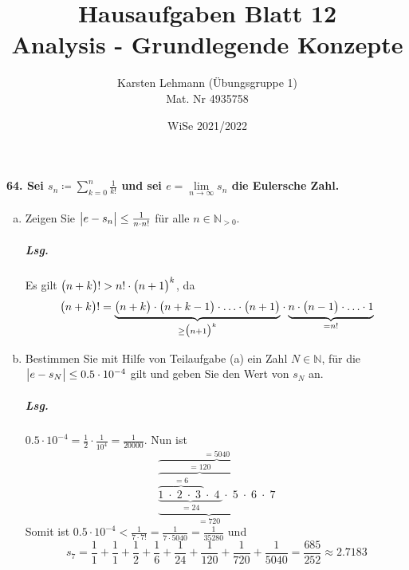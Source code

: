 \documentclass{scrreprt}
\author{Karsten Lehmann (Übungsgruppe 1)\\Mat. Nr 4935758}
\date{WiSe 2021/2022}
\title{Hausaufgaben Blatt 12\\Analysis - Grundlegende Konzepte}
\begin{document}
\paragraph{64. Sei $s_n \coloneqq \sum_{k = 0}^n \frac{1}{k!}$ und sei
  $e = \underset{n \to \infty}\lim s_n$ die Eulersche Zahl.}
\begin{enumerate}[(a)]
\item Zeigen Sie $\abs\big{e - s_n} \leq \frac{1}{n \cdot n!}$ für alle
  $n \in \mathbb{N}_{> 0}$.

  \subparagraph{Lsg.} Es gilt $\qty\big(n + k)! > n! \cdot \qty\big(n + 1)^k$, da
  \[
    \qty\big(n + k)! =
    \underset{\geq \qty\big(n + 1)^k}{
      \underbrace{
        \qty\big(n + k) \cdot \qty\big(n + k - 1) \cdot
        \ldots \cdot \qty\big(n + 1)
      }
    } \cdot
    \underset{= n!}{\underbrace{n \cdot \qty\big(n - 1) \cdot \ldots \cdot 1}}
  \]

\item Bestimmen Sie mit Hilfe von Teilaufgabe (a) ein Zahl $N \in \mathbb{N}$,
  für die $\abs\big{e - s_N} \leq 0.5 \cdot 10^{-4}$ gilt und geben Sie den Wert
  von $s_N$ an.

  \subparagraph{Lsg.} $0.5 \cdot 10^{-4} = \frac{1}{2} \cdot \frac{1}{10^4} =
  \frac{1}{20000}$.
  Nun ist
  \[
    \overset{= 5040}{
      \overbrace{
        \underset{= 720}{
          \underbrace{
            \overset{= 120}{
              \overbrace{
                \underset{= 24}{
                  \underbrace{
                    \overset{= 6}{
                      \overbrace{
                        1 \; \cdot \; 2 \; \cdot \; 3 \;
                      }
                    } \cdot \; 4 \;
                  }
                } \cdot \; 5 \;
              }
            } \cdot \; 6 \;
          }
        } \cdot \; 7
      }
    }
  \]
  Somit ist $0.5 \cdot 10^{-4} < \frac{1}{7 \cdot 7!} = \frac{1}{7 \cdot 5040}
  = \frac{1}{35280}$ und
  \[
    s_7 = \frac{1}{1} + \frac{1}{1} + \frac{1}{2} + \frac{1}{6} + \frac{1}{24}
    + \frac{1}{120} + \frac{1}{720} + \frac{1}{5040}
    = \frac{685}{252} \approx 2.7183
  \]


\end{enumerate}
\end{document}
